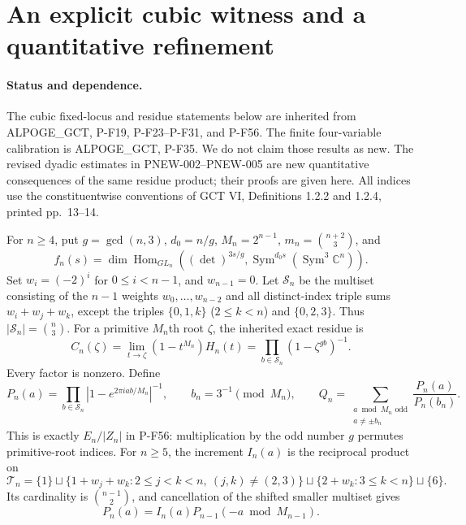 \section{An explicit cubic witness and a quantitative refinement}
\label{sec:plethysm-quantitative}

\paragraph{Status and dependence.}
The cubic fixed-locus and residue statements below are inherited from
ALPOGE\_GCT, P-F19, P-F23--P-F31, and P-F56.  The finite four-variable
calibration is ALPOGE\_GCT, P-F35.  We do not claim those results as new.
The revised dyadic estimates in PNEW-002--PNEW-005 are new quantitative
consequences of the same residue product; their proofs are given here.
All indices use the constituentwise conventions of GCT VI,
Definitions 1.2.2 and 1.2.4, printed pp.\ 13--14.

For $n\ge4$, put $g=\gcd(n,3)$, $d_0=n/g$, $M_n=2^{n-1}$,
$m_n=\binom{n+2}{3}$, and
\[
 f_n(s)=\dim\operatorname{Hom}_{GL_n}
  ((\det)^{3s/g},\operatorname{Sym}^{d_0s}(\operatorname{Sym}^3\mathbb C^n)).
\]
Set $w_i=(-2)^i$ for $0\le i<n-1$, and $w_{n-1}=0$.
Let $\mathcal S_n$ be the multiset consisting of the $n-1$ weights
$w_0,\ldots,w_{n-2}$ and all distinct-index triple sums
$w_i+w_j+w_k$, except the triples $\{0,1,k\}$ ($2\le k<n$)
and $\{0,2,3\}$.  Thus $|\mathcal S_n|=\binom n3$.
For a primitive $M_n$th root $\zeta$, the inherited exact residue is
\[
 C_n(\zeta)=\lim_{t\to\zeta}(1-t^{M_n})H_n(t)
       =\prod_{b\in\mathcal S_n}(1-\zeta^{gb})^{-1}.
 \tag{PNEW-R}
\]
Every factor is nonzero.  Define
\[
 P_n(a)=\prod_{b\in\mathcal S_n}|1-e^{2\pi iab/M_n}|^{-1},
 \qquad b_n=3^{-1}\pmod {M_n},
 \qquad
 Q_n=\sum_{\substack{a\bmod M_n\text{ odd}\\a\ne\pm b_n}}
            \frac{P_n(a)}{P_n(b_n)}.
\]
This is exactly $E_n/|Z_n|$ in P-F56: multiplication by the odd
number $g$ permutes primitive-root indices.  For $n\ge5$, the
increment $I_n(a)$ is the reciprocal product on
\[
 \mathcal T_n=\{1\}\sqcup
 \{1+w_j+w_k:2\le j<k<n,\ (j,k)\ne(2,3)\}
 \sqcup\{2+w_k:3\le k<n\}\sqcup\{6\}.
\]
Its cardinality is $\binom{n-1}{2}$, and cancellation of the shifted
smaller multiset gives
\[
 P_n(a)=I_n(a)P_{n-1}(-a\bmod M_{n-1}).
 \tag{PNEW-rec}
\]

